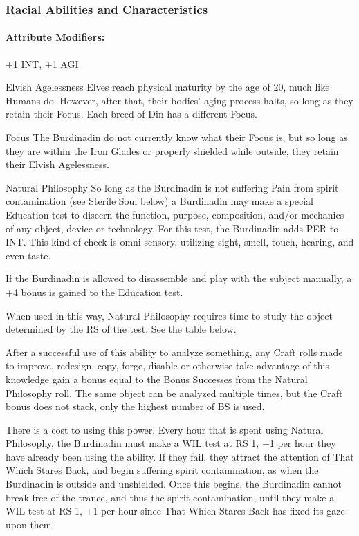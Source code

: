 \documentclass[oneside,11pt,english]{book}
\begin{document}
 

\subsubsection*{Racial Abilities and Characteristics} 
\paragraph{Attribute Modifiers:} +1 INT, +1 AGI 

 

Elvish Agelessness 
Elves reach physical maturity by the age of 20, much like Humans do. However, after that, their 
bodies' aging process halts, so long as they retain their Focus. Each breed of Din has a different 
Focus. 

 

Focus 
The Burdinadin do not currently know what their Focus is, but so long as they are within the Iron 
Glades or properly shielded while outside, they retain their Elvish Agelessness. 


 

Natural Philosophy 
So long as the Burdinadin is not suffering Pain from spirit contamination (see Sterile Soul below) 
a Burdinadin may make a special Education test to discern the function, purpose, composition, 
and/or mechanics of any object, device or technology. For this test, the Burdinadin adds PER to 
INT. This kind of check is omni-sensory, utilizing sight, smell, touch, hearing, and even taste. 

 

If the Burdinadin is allowed to disassemble and play with the subject manually, a +4 bonus is 
gained to the Education test. 

 

When used in this way, Natural Philosophy requires time to study the object determined by the 
RS of the test. See the table below. 

 

After a successful use of this ability to analyze something, any Craft rolls made to improve, 
redesign, copy, forge, disable or otherwise take advantage of this knowledge gain a bonus equal 
to the Bonus Successes from the Natural Philosophy roll. The same object can be analyzed 
multiple times, but the Craft bonus does not stack, only the highest number of BS is used. 

 

There is a cost to using this power. Every hour that is spent using Natural Philosophy, the 
Burdinadin must make a WIL test at RS 1, +1 per hour they have already been using the ability. If 
they fail, they attract the attention of That Which Stares Back, and begin suffering spirit 
contamination, as when the Burdinadin is outside and unshielded. Once this begins, the 
Burdinadin cannot break free of the trance, and thus the spirit contamination, until they make a 
WIL test at RS 1, +1 per hour since That Which Stares Back has fixed its gaze upon them. 
\end{document}

